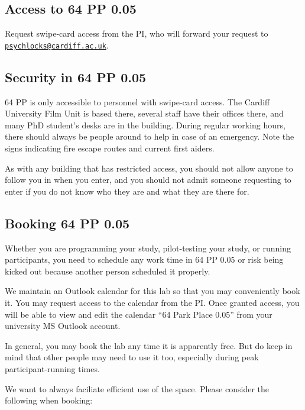 \documentclass[12pt,]{book}
\theoremstyle{definition}
\theoremstyle{definition}
\theoremstyle{definition}
\theoremstyle{remark}
\begin{document}
\subsection{Access to 64 PP 0.05}\label{access-to-64-pp-0.05}

Request swipe-card access from the PI, who will forward your request to
\href{mailto:psychlocks@cardiff.ac.uk}{\nolinkurl{psychlocks@cardiff.ac.uk}}.

\subsection{Security in 64 PP 0.05}\label{security-in-64-pp-0.05}

64 PP is only accessible to personnel with swipe-card access. The
Cardiff University Film Unit is based there, several staff have their
offices there, and many PhD student's desks are in the building. During
regular working hours, there should always be people around to help in
case of an emergency. Note the signs indicating fire escape routes and
current first aiders.

As with any building that has restricted access, you should not allow
anyone to follow you in when you enter, and you should not admit someone
requesting to enter if you do not know who they are and what they are
there for.

\subsection{Booking 64 PP 0.05}\label{booking-64-pp-0.05}

Whether you are programming your study, pilot-testing your study, or
running participants, you need to schedule any work time in 64 PP 0.05
or risk being kicked out because another person scheduled it properly.

We maintain an Outlook calendar for this lab so that you may
conveniently book it. You may request access to the calendar from the
PI. Once granted access, you will be able to view and edit the calendar
``64 Park Place 0.05'' from your university MS Outlook account.

In general, you may book the lab any time it is apparently free. But do
keep in mind that other people may need to use it too, especially during
peak participant-running times.

We want to always faciliate efficient use of the space. Please consider
the following when booking:
\end{document}
